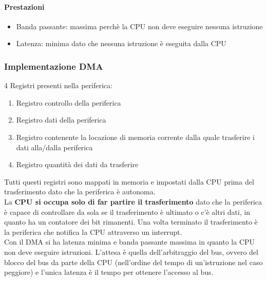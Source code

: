 \documentclass[12pt, a4paper, openany]{book}
\begin{document}
\paragraph*{Prestazioni}
\begin{itemize}
    \item Banda passante: massima perchè la CPU non deve eseguire nessuna istruzione
    \item Latenza: minima dato che nessuna istruzione è eseguita dalla CPU
\end{itemize}

\subsubsection*{Implementazione DMA}
4 Registri presenti nella periferica:
\begin{enumerate}
    \item Registro controllo della periferica
    \item Registro dati della periferica
    \item Registro contenente la locazione di memoria corrente dalla quale trasferire
    i dati alla/dalla periferica
    \item Registro quantità dei dati da trasferire
\end{enumerate}
Tutti questi registri sono mappati in memoria e impostati dalla CPU prima del trasferimento
dato che la periferica è autonoma.
\\ La \textbf{CPU si occupa solo di far partire il trasferimento} dato che la periferica è
capace di controllare da sola se il trasferimento è ultimato o c'è altri dati, in quanto 
ha un contatore dei bit rimanenti. Una volta terminato il trasferimento è la periferica che
notifica la CPU attraverso un interrupt.
\\ Con il DMA si ha latenza minima e banda passante massima in quanto la CPU
non deve eseguire istruzioni. L’attesa è quella dell’arbitraggio del bus, ovvero
del blocco del bus da parte della CPU (nell’ordine del tempo di un’istruzione
nel caso peggiore) e l’unica latenza è il tempo per ottenere l’accesso al bus.

\end{document}
